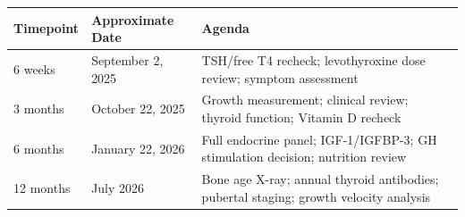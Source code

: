 \documentclass[11pt,a4paper]{article}
\begin{document}
\vspace{3mm}

\begin{tcolorbox}[pedgold, title={\faCalendar\enspace Follow-up Schedule}]
  \renewcommand{\arraystretch}{1.25}
  \begin{tabularx}{\linewidth}{@{} l l >{\RaggedRight\arraybackslash}X @{}}
    \toprule
    \rowcolor{TableHead}
    \textbf{Timepoint} & \textbf{Approximate Date} & \textbf{Agenda} \\
    \midrule
    6 weeks            & September 2, 2025   & TSH/free T4 recheck; levothyroxine
                                               dose review; symptom assessment \\
    \rowcolor{TableAlt}
    3 months           & October 22, 2025    & Growth measurement; clinical review;
                                               thyroid function; Vitamin D recheck \\
    6 months           & January 22, 2026    & Full endocrine panel; IGF-1/IGFBP-3;
                                               GH stimulation decision; nutrition review \\
    \rowcolor{TableAlt}
    12 months          & July 2026           & Bone age X-ray; annual thyroid antibodies;
                                               pubertal staging; growth velocity analysis \\
    \bottomrule
  \end{tabularx}
\end{tcolorbox}

\vspace{4mm}
\end{document}
